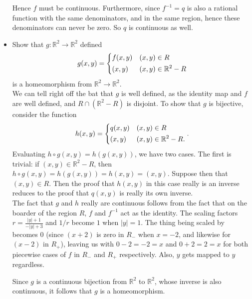 \documentclass{article}
\newcommand{\inv}[1]{#1^{-1}}
\newcommand{\R}{\mathbb{R}}
\newcommand{\inv}[1]{#1^{-1}}
\newcommand{\R}{\mathbb{R}}
\begin{document}
\begin{itemize}
    Hence $f$ must be continuous. Furthermore, since $f^{-1} = q$ is also a rational function with the same denominators, and in the same region, hence these denominators can never be zero. So $q$ is continuous as well.
    
    \item Show that $g:\R^2\rightarrow \R^2$ defined
    $$g(x,y) = \begin{dcases}
    f(x,y) & (x,y)\in R\\
    (x,y) & (x,y)\in \R^2-R
    \end{dcases}$$ is a homeomorphism from $\R^2\rightarrow \R^2$.\\
    
     We can tell right off the bat that $g$ is well defined, as the identity map and $f$ are well defined, and $R\cap (\R^2-R)$ is disjoint. To show that $g$ is bijective, consider the function $$
    h(x,y) = 
    \begin{dcases}
    q(x,y) & (x,y)\in R\\
    (x,y) & (x,y)\in \R^2 - R.
    \end{dcases}.$$
    Evaluating $h\circ g(x,y) = h(g(x,y))$, we have two cases. The first is trivial: if $(x,y)\in \R^2- R$, then $h\circ g(x,y) = h(g(x,y)) = h(x,y) = (x,y)$. Suppose then that $(x,y)\in R$. Then the proof that $h(x,y)$ in this case really is an inverse reduces to the proof that $q(x,y)$ is really its own inverse.\\
    
    The fact that $g$ and $h$ really are continuous follows from the fact that on the boarder of the region $R$, $f$ and $\inv{f}$ act as the identity. The scaling factors $r = \frac{|y|+ 1}{-|y| + 3}$ and $1/r$ become $1$ when $|y| = 1$. The thing being scaled by becomes $0$ (since $(x+2)$ is zero in $R_-$ when $x = -2$, and likewise for $(x-2)$ in $R_+$), leaving us with $0-2 = -2 = x$ and $ 0 + 2 = 2 = x $ for both piecewise cases of $f$ in $R_-$ and $R_+$ respectively. Also, $y$ gets mapped to $y$ regardless.
    
    Since $g$ is a continuous bijection from $\R^2$ to $\R^2$, whose inverse is also continuous, it follows that $g$ is a homeomorphism.
\end{itemize}

\newpage
\end{document}
